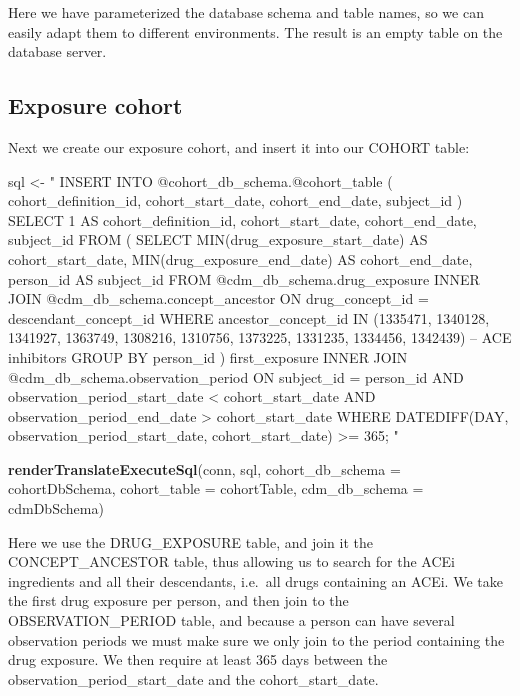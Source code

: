 \documentclass[11pt]{book}
\newenvironment{Shaded}{\begin{snugshade}}{\end{snugshade}}
\newcommand{\KeywordTok}[1]{\textcolor[rgb]{0.13,0.29,0.53}{\textbf{#1}}}
\newcommand{\DataTypeTok}[1]{\textcolor[rgb]{0.13,0.29,0.53}{#1}}
\newcommand{\StringTok}[1]{\textcolor[rgb]{0.31,0.60,0.02}{#1}}
\newcommand{\NormalTok}[1]{#1}
\begin{document}
Here we have parameterized the database schema and table names, so we
can easily adapt them to different environments. The result is an empty
table on the database server.

\subsection{Exposure cohort}\label{exposure-cohort}

Next we create our exposure cohort, and insert it into our COHORT table:

\begin{Shaded}
\begin{Highlighting}[]
\NormalTok{sql <-}\StringTok{ "}
\StringTok{INSERT INTO @cohort_db_schema.@cohort_table (}
\StringTok{  cohort_definition_id,}
\StringTok{  cohort_start_date,}
\StringTok{  cohort_end_date,}
\StringTok{  subject_id}
\StringTok{)}
\StringTok{SELECT 1 AS cohort_definition_id,}
\StringTok{  cohort_start_date,}
\StringTok{  cohort_end_date,}
\StringTok{  subject_id}
\StringTok{FROM (}
\StringTok{  SELECT MIN(drug_exposure_start_date) AS cohort_start_date,}
\StringTok{    MIN(drug_exposure_end_date) AS cohort_end_date,}
\StringTok{    person_id AS subject_id}
\StringTok{  FROM @cdm_db_schema.drug_exposure}
\StringTok{  INNER JOIN @cdm_db_schema.concept_ancestor}
\StringTok{    ON drug_concept_id = descendant_concept_id}
\StringTok{  WHERE ancestor_concept_id IN (1335471, 1340128, 1341927,}
\StringTok{    1363749, 1308216, 1310756, 1373225, 1331235, 1334456,}
\StringTok{    1342439) -- ACE inhibitors}
\StringTok{  GROUP BY person_id}
\StringTok{) first_exposure}
\StringTok{INNER JOIN @cdm_db_schema.observation_period}
\StringTok{  ON subject_id = person_id}
\StringTok{    AND observation_period_start_date < cohort_start_date}
\StringTok{    AND observation_period_end_date > cohort_start_date}
\StringTok{WHERE DATEDIFF(DAY,}
\StringTok{               observation_period_start_date,}
\StringTok{               cohort_start_date) >= 365;}
\StringTok{"}

\KeywordTok{renderTranslateExecuteSql}\NormalTok{(conn, sql,}
                          \DataTypeTok{cohort_db_schema =}\NormalTok{ cohortDbSchema,}
                          \DataTypeTok{cohort_table =}\NormalTok{ cohortTable,}
                          \DataTypeTok{cdm_db_schema =}\NormalTok{ cdmDbSchema)}
\end{Highlighting}
\end{Shaded}

Here we use the DRUG\_EXPOSURE table, and join it the CONCEPT\_ANCESTOR
table, thus allowing us to search for the ACEi ingredients and all their
descendants, i.e.~all drugs containing an ACEi. We take the first drug
exposure per person, and then join to the OBSERVATION\_PERIOD table, and
because a person can have several observation periods we must make sure
we only join to the period containing the drug exposure. We then require
at least 365 days between the observation\_period\_start\_date and the
cohort\_start\_date.
\end{document}

